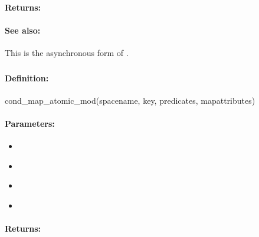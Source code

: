 \paragraph{Returns:}


\paragraph{See also:}  This is the asynchronous form of .

\pagebreak
\subsubsection{}
\label{api:ruby:cond_map_atomic_mod}


\paragraph{Definition:}
\begin{rubycode}
cond_map_atomic_mod(spacename, key, predicates, mapattributes)
\end{rubycode}

\paragraph{Parameters:}
\begin{itemize}[noitemsep]
\item {}\\

\item {}\\

\item {}\\

\item {}\\

\end{itemize}

\paragraph{Returns:}


